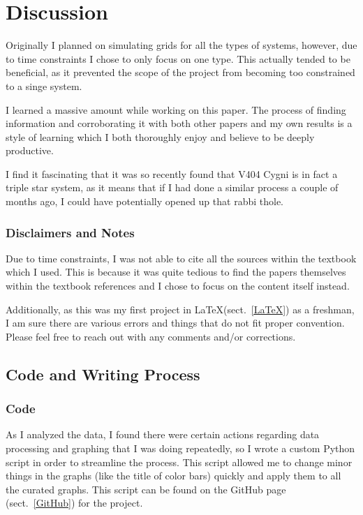 \documentclass[12pt, a4paper]{article}
\begin{document}
\section{Discussion}   
    Originally I planned on simulating grids for all the types of systems, however, due to time constraints I chose to only focus on one type. This actually tended to be beneficial, as it prevented the scope of the project from becoming too constrained to a singe system. 

    I learned a massive amount while working on this paper. The process of finding information and corroborating it with both other papers and my own results is a style of learning which I both thoroughly enjoy and believe to be deeply productive.

    I find it fascinating that it was so recently found that V404 Cygni is in fact a triple star system, as it means that if I had done a similar process a couple of months ago, I could have potentially opened up that rabbi thole. 

    \subsubsection{Disclaimers and Notes}
        Due to time constraints, I was not able to cite all the sources within the textbook \parencite{TaurisvandenHeuvel+2023} which I used. This is because it was quite tedious to find the papers themselves within the textbook references and I chose to focus on the content itself instead. 

        Additionally, as this was my first project in \LaTeX (sect.~\ref{LaTeX}) as a freshman, I am sure there are various errors and things that do not fit proper convention. Please feel free to reach out with any comments and/or corrections.

    \subsection{Code and Writing Process}
        \subsubsection{Code}

            As I analyzed the data, I found there were certain actions regarding data processing and graphing that I was doing repeatedly, so I wrote a custom Python script in order to streamline the process. This script allowed me to change minor things in the graphs (like the title of color bars) quickly and apply them to all the curated graphs. This script can be found on the GitHub page (sect.~\ref{GitHub}) for the project. 
\end{document}
